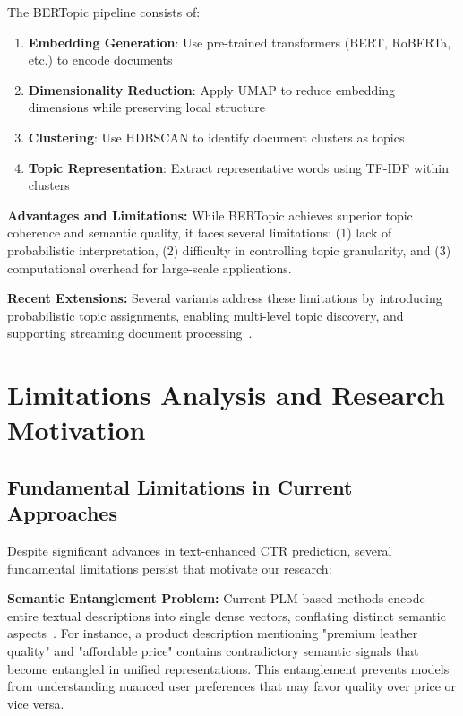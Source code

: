 The BERTopic pipeline consists of:
\begin{enumerate}
    \item \textbf{Embedding Generation}: Use pre-trained transformers (BERT, RoBERTa, etc.) to encode documents
    \item \textbf{Dimensionality Reduction}: Apply UMAP to reduce embedding dimensions while preserving local structure
    \item \textbf{Clustering}: Use HDBSCAN to identify document clusters as topics
    \item \textbf{Topic Representation}: Extract representative words using TF-IDF within clusters
\end{enumerate}

\textbf{Advantages and Limitations:} While BERTopic achieves superior topic coherence and semantic quality, it faces several limitations: (1) lack of probabilistic interpretation, (2) difficulty in controlling topic granularity, and (3) computational overhead for large-scale applications.

\textbf{Recent Extensions:} Several variants address these limitations by introducing probabilistic topic assignments, enabling multi-level topic discovery, and supporting streaming document processing~\cite{wu2023effective}.

\section{Limitations Analysis and Research Motivation}

\subsection{Fundamental Limitations in Current Approaches}

Despite significant advances in text-enhanced CTR prediction, several fundamental limitations persist that motivate our research:

\textbf{Semantic Entanglement Problem:} Current PLM-based methods encode entire textual descriptions into single dense vectors, conflating distinct semantic aspects~\cite{wang2023bert4ctr, li2023ctrl}. For instance, a product description mentioning "premium leather quality" and "affordable price" contains contradictory semantic signals that become entangled in unified representations. This entanglement prevents models from understanding nuanced user preferences that may favor quality over price or vice versa.

